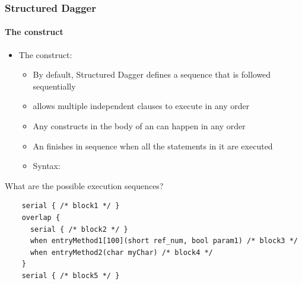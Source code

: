 \documentclass{beamer}
\begin{document}

\begin{frame}[fragile]
  \frametitle{Structured Dagger}
  \framesubtitle{The  construct}
  \begin{itemize}
  \item The  construct:
    \begin{itemize}
    \item By default, Structured Dagger defines a sequence that is followed sequentially
    \item {} allows multiple independent clauses to execute in any order
    \item Any constructs in the body of an  can happen in any
      order
    \item An  finishes in sequence when all the statements in it
      are executed
    \item Syntax: 
    \end{itemize}
  \end{itemize}
  What are the possible execution sequences?
  \begin{lstlisting}
    serial { /* block1 */ }
    overlap {
      serial { /* block2 */ }
      when entryMethod1[100](short ref_num, bool param1) /* block3 */
      when entryMethod2(char myChar) /* block4 */
    }
    serial { /* block5 */ }
  \end{lstlisting}
\end{frame}
\end{document}
